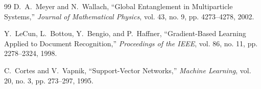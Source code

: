 \documentclass[journal]{IEEEtran}
\begin{document}
\begin{thebibliography}{99}
D.~A.~Meyer and N.~Wallach,
``Global Entanglement in Multiparticle Systems,''
\emph{Journal of Mathematical Physics}, vol. 43, no. 9,
pp. 4273--4278, 2002.

Y.~LeCun, L.~Bottou, Y.~Bengio, and P.~Haffner,
``Gradient-Based Learning Applied to Document Recognition,''
\emph{Proceedings of the IEEE}, vol. 86, no. 11,
pp. 2278--2324, 1998.

C.~Cortes and V.~Vapnik,
``Support-Vector Networks,''
\emph{Machine Learning}, vol. 20, no. 3,
pp. 273--297, 1995.

\end{thebibliography}
\end{document}
